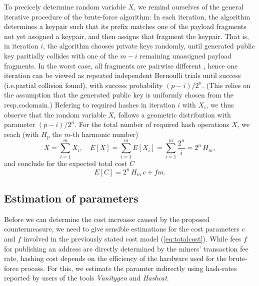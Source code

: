 \documentclass[10pt,a4paper,twocolumn]{article}
\begin{document}
To precicely determine random variable $X$, we remind ourselves of the general iterative procedure of the brute-force algorithm:
In each iteration, the algorithm determines a keypair such that its prefix matches one of the payload fragments not yet assigned a keypair, and then assigns that fragment the keypair.
That is, in iteration $i$, the algorithm chooses private keys randomly, until generated public key paritially collides with one of the $m-i$ remaining unassigned payload fragments.
In the worst case, all fragments are pairwise different%
, hence one iteration can be viewed as repeated independent Bernoulli trials until success (i.e.\@ partial collision found), with success probability $(p-i)/2^n$.  
(This relies on the assumption that the generated public key is uniformly chosen from the resp.\@ codomain.)
Refering to required hashes in iteration $i$ with $X_i$, we thus observe that the random variable $X_i$ follows a geometric distribution with parameter $(p-i)/2^n$.
For the total number of required hash operations $X$, we reach (with $H_p$ the $m$-th harmonic number)
\[ X = \sum_{i=1}^{m} X_i, \quad E[X] = \sum_{i=1}^{m} E[X_i] = \sum_{i=1}^{m}\frac{2^n}{i} = 2^n\, H_m, \]
and conclude for the expected total cost $C$
\begin{equation}
    E[C] = 2^n\, H_m\,c + fm.\label{eq:totalcost}
\end{equation}


\subsection{Estimation of parameters}



Before we can determine the cost increasse caused by the proposed countermeasure, we need to give sensible estimations for the cost parameters $c$ and $f$ involved in the previously stated cost model (\ref{eq:totalcost}).
While fees $f$ for publishing an address are directly determined by the miners' transaction fee rate, hashing cost depends on the efficiency of the hardware used for the brute-force process.
For this, we estimate the paramter indirectly using hash-rates reported by users of the tools \emph{Vanitygen} and \emph{Hashcat}.
\end{document}
